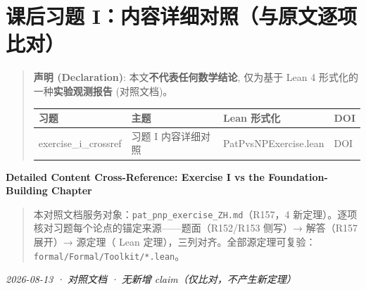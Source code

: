 \documentclass[
]{article}
\author{}
\date{}
\newcounter{none} %
\begin{document}
\section{课后习题
I：内容详细对照（与原文逐项比对）}\label{ux7b51ux57faux7bc7ux8bfeux540eux4e60ux9898-iux5185ux5bb9ux8be6ux7ec6ux5bf9ux7167ux4e0eux7b51ux57faux7bc7ux539fux6587ux9010ux9879ux6bd4ux5bf9}

\begin{quote}
\textbf{声明 (Declaration)}: 本文\textbf{不代表任何数学结论}, 仅为基于
Lean 4 形式化的一种\textbf{实验观测报告} (对照文档)。

{\def\LTcaptype{none} %
\begin{longtable}[]{@{}
 >{\raggedright\arraybackslash}p{}
 >{\raggedright\arraybackslash}p{}
 >{\raggedright\arraybackslash}p{}
 >{\raggedright\arraybackslash}p{}@{}}
\toprule\noalign{}
\begin{minipage}[b]{\linewidth}\raggedright
习题
\end{minipage} & \begin{minipage}[b]{\linewidth}\raggedright
主题
\end{minipage} & \begin{minipage}[b]{\linewidth}\raggedright
Lean 形式化
\end{minipage} & \begin{minipage}[b]{\linewidth}\raggedright
DOI
\end{minipage} \\
\midrule\noalign{}
\endhead
\bottomrule\noalign{}
\endlastfoot
exercise\_i\_crossref & 习题 I 内容详细对照 & PatPvsNPExercise.lean &
DOI \\
\end{longtable}
}
\end{quote}

\textbf{Detailed Content Cross-Reference: Exercise I vs the
Foundation-Building Chapter}

\begin{quote}
本对照文档服务对象：\texttt{pat\_pnp\_exercise\_ZH.md}（R157，4
新定理）。逐项核对习题每个论点的锚定来源------题面（R152/R153 侧写）→
解答（R157 展开）→ 源定理（ Lean
定理），三列对齐。全部源定理可复验：\texttt{formal/Formal/Toolkit/*.lean}。
\end{quote}

\emph{2026-08-13 · 对照文档 · 无新增 claim（仅比对，不产生新定理）}
\end{document}
